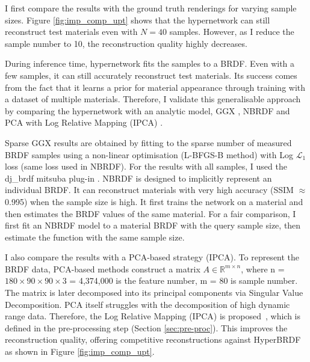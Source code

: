 I first compare the results with the ground truth renderings for varying sample sizes. Figure \ref{fig:imp_comp_upt} shows that the hypernetwork can still reconstruct test materials even with $N = 40$ samples. However, as I reduce the sample number to 10, the reconstruction quality highly decreases. 

During inference time, hypernetwork fits the samples to a \gls{BRDF}. Even with a few samples, it can still accurately reconstruct test materials. Its success comes from the fact that it learns a prior for material appearance through training with a dataset of multiple materials. Therefore, I validate this generalisable approach by comparing the hypernetwork with an analytic model, GGX  \cite{walter2007microfacet}, NBRDF \cite{sztrajman2021neural} and PCA with Log Relative Mapping (IPCA) \cite{nielsen2015optimal}.

Sparse GGX results are obtained by fitting to the sparse number of measured \gls{BRDF} samples using a non-linear optimisation (L-BFGS-B method) with Log $\mathcal{L}_{1}$ loss (same loss used in NBRDF). For the results with all samples, I used the dj\_brdf mitsuba plug-in \cite{dupuy2015photorealistic}. NBRDF \cite{sztrajman2021neural} is designed to implicitly represent an individual \gls{BRDF}. It can reconstruct materials with very high accuracy (\gls{SSIM} $\approx$ 0.995) when the sample size is high. It first trains the network on a material and then estimates the \gls{BRDF} values of the same material. For a fair comparison, I first fit an NBRDF model to a material \gls{BRDF} with the query sample size, then estimate the function with the same sample size. 

I also compare the results with a PCA-based strategy (IPCA). To represent the \gls{BRDF} data, PCA-based methods  \cite{matusik2003data, ngan2006image} construct a matrix ${A} \in \mathbb{R}^{m \times n}$, where n = $180 \times 90 \times 90 \times 3$ = 4,374,000 is the feature number, m = 80 is sample number. The matrix is later decomposed into its principal components via Singular Value Decomposition. PCA itself struggles with the decomposition of high dynamic range data. Therefore, the Log Relative Mapping (IPCA) is proposed~\cite{nielsen2015optimal}, which is defined in the pre-processing step (Section \ref{sec:pre-proc}). This improves the reconstruction quality, offering competitive reconstructions against HyperBRDF as shown in Figure \ref{fig:imp_comp_upt}.

